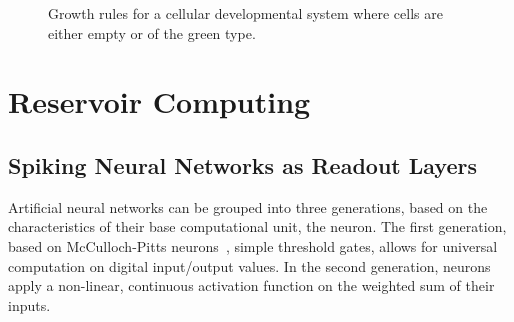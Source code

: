 \begin{figure}[ht]
  \centering
  \caption{
    Growth rules for a cellular developmental system where cells are
    either empty or of the green type.
  }\label{fig:growth-rules}

\end{figure}
\clearpage

\section{Reservoir Computing}

\subsection{Spiking Neural Networks as Readout Layers}


Artificial neural networks can be grouped into three generations, based on the characteristics of their base computational unit, the neuron.
The first generation, based on McCulloch-Pitts neurons~\cite{McCulloch1943}, simple threshold gates, allows for universal computation on digital input/output values.
In the second generation, neurons apply a non-linear, continuous activation function on the weighted sum of their inputs.

